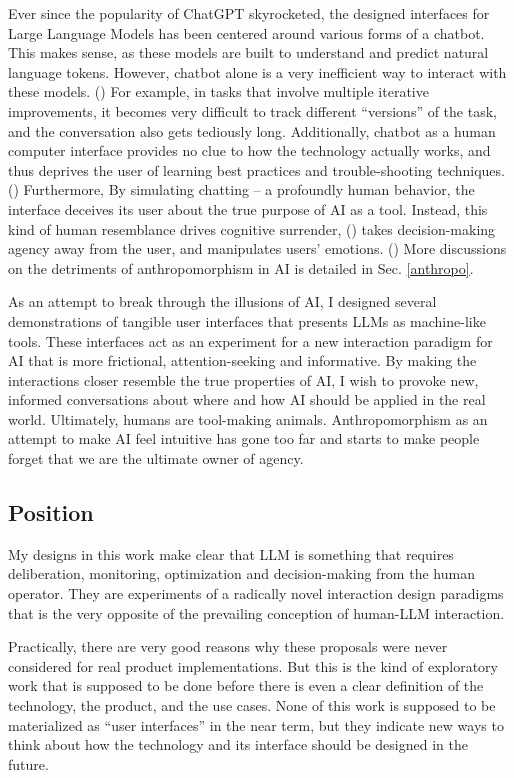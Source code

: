 \documentclass[12pt]{article}
\begin{document}
Ever since the popularity of ChatGPT skyrocketed, the designed interfaces for Large Language Models has been centered around various forms of a chatbot. This makes sense, as these models are built to understand and predict natural language tokens. However, chatbot alone is a very inefficient way to interact with these models. (\cite{efficiency}) For example, in tasks that involve multiple iterative improvements, it becomes very difficult to track different ``versions'' of the task, and the conversation also gets tediously long. Additionally, chatbot as a human computer interface provides no clue to how the technology actually works, and thus deprives the user of learning best practices and trouble-shooting techniques. (\cite{boo-chatbot}) Furthermore, By simulating chatting -- a profoundly human behavior, the interface deceives its user about the true purpose of AI as a tool. Instead, this kind of human resemblance drives cognitive surrender, (\cite{surrender}) takes decision-making agency away from the user, and manipulates users' emotions. (\cite{moral}) More discussions on the detriments of anthropomorphism in AI is detailed in Sec. \ref{anthropo}.

As an attempt to break through the illusions of AI, I designed several demonstrations of tangible user interfaces that presents LLMs as machine-like tools. These interfaces act as an experiment for a new interaction paradigm for AI that is more frictional, attention-seeking and informative. By making the interactions closer resemble the true properties of AI, I wish to provoke new, informed conversations about where and how AI should be applied in the real world. Ultimately, humans are tool-making animals. Anthropomorphism as an attempt to make AI feel intuitive has gone too far and starts to make people forget that we are the ultimate owner of agency. 

\subsection{Position}
My designs in this work make clear that LLM is something that requires deliberation, monitoring, optimization and decision-making from the human operator. They are experiments of a radically novel interaction design paradigms that is the very opposite of the prevailing conception of human-LLM interaction.

Practically, there are very good reasons why these proposals were never considered for real product implementations. But this is the kind of exploratory work that is supposed to be done before there is even a clear definition of the technology, the product, and the use cases. None of this work is supposed to be materialized as “user interfaces” in the near term, but they indicate new ways to think about how the technology and its interface should be designed in the future.
\end{document}
